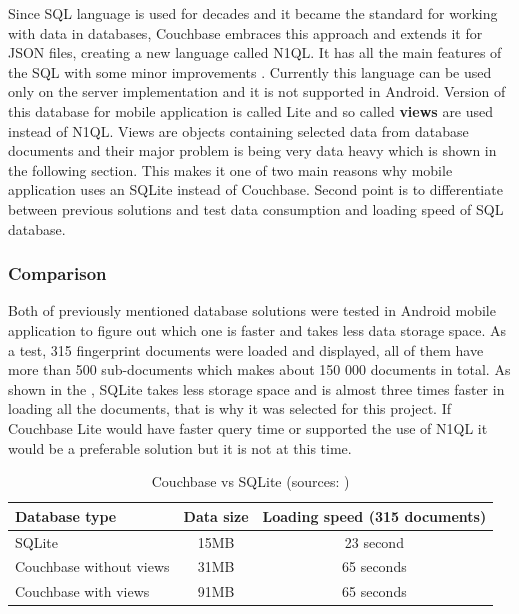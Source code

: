 Since SQL language is used for decades and it became the standard for working with data in databases, Couchbase embraces this approach and extends it for JSON files, creating a new language called N1QL. It has all the main features of the SQL with some minor improvements \cite{WINQL}. Currently this language can be used only on the server implementation and it is not supported in Android. Version of this database for mobile application is called Lite and so called \textbf{views} are used instead of N1QL. Views are objects containing selected data from database documents and their major problem is being very data heavy which is shown in the following section. This makes it one of two main reasons why mobile application uses an SQLite instead of Couchbase. Second point is to differentiate between previous solutions and test data consumption and loading speed of SQL database.

\subsubsection{Comparison}\label{subsubsec:Comparison}
Both of previously mentioned database solutions were tested in Android mobile application to figure out which one is faster and takes less data storage space. As a test, 315 fingerprint documents were loaded and displayed, all of them have more than 500 sub-documents which makes about 150 000 documents in total. As shown in the , SQLite takes less storage space and is almost three times faster in loading all the documents, that is why it was selected for this project. If Couchbase Lite would have faster query time or supported the use of N1QL it would be a preferable solution but it is not at this time.

\vspace*{6pt}
\begin{table}[h]
	\begin{center}
		\scriptsize
		\begin{tabular}{| l | c | c |}
			\hline
			Database type & Data size & Loading speed (315 documents) \\ \hline
			SQLite & 15MB & 23 second \\ \hline
			Couchbase without views & 31MB & 65 seconds \\ \hline
			Couchbase with views & 91MB & 65 seconds \\ \hline
		\end{tabular}
		\caption{Couchbase vs SQLite (sources: \cite{LGWSP, LGWST, HW2, PM600, AZW3})}
		\label{tab3}
	\end{center}
\end{table}
\vspace*{-\baselineskip}
\vspace*{6pt}

